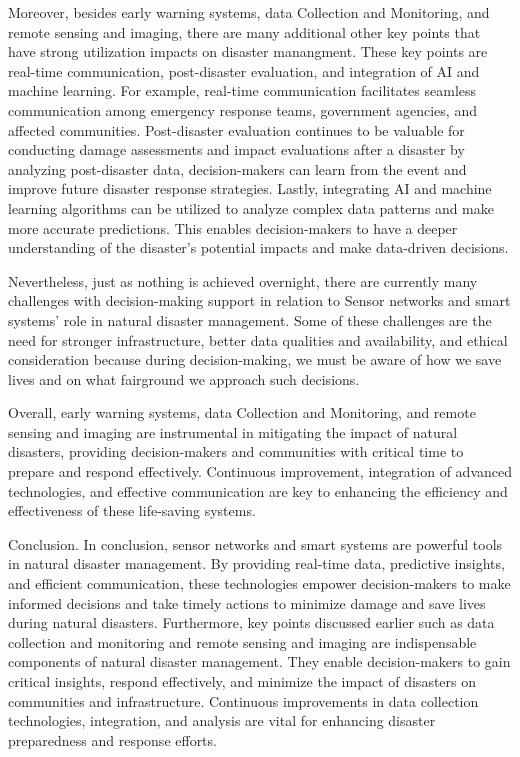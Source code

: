 \documentclass[conference]{IEEEtran}
\begin{document}
Moreover, besides early warning systems, data Collection and Monitoring, and remote sensing and imaging, 
there are many additional other key points that have strong utilization impacts on disaster manangment. 
These key points are real-time communication, post-disaster evaluation, and integration of AI and machine 
learning. For example, real-time communication facilitates seamless communication among emergency response 
teams, government agencies, and affected communities. Post-disaster evaluation continues to be valuable 
for conducting damage assessments and impact evaluations after a disaster by analyzing post-disaster 
data, decision-makers can learn from the event and improve future disaster response strategies. Lastly, 
integrating AI and machine learning algorithms can be utilized to analyze complex data patterns and make 
more accurate predictions. This enables decision-makers to have a deeper understanding of the disaster's 
potential impacts and make data-driven decisions.\par

Nevertheless, just as nothing is achieved overnight, there are currently many challenges with decision-making 
support in relation to Sensor networks and smart systems' role in natural disaster management. Some of these 
challenges are the need for stronger infrastructure, better data qualities and availability, and ethical 
consideration because during decision-making, we must be aware of how we save lives and on what fairground 
we approach such decisions.\par

Overall, early warning systems, data Collection and Monitoring, and remote sensing and imaging are instrumental 
in mitigating the impact of natural disasters, providing decision-makers and communities with critical 
time to prepare and respond effectively. Continuous improvement, integration of advanced technologies, 
and effective communication are key to enhancing the efficiency and effectiveness of these 
life-saving systems.\par

Conclusion. In conclusion, sensor networks and smart systems are powerful tools in natural disaster management. 
By providing real-time data, predictive insights, and efficient communication, these technologies empower 
decision-makers to make informed decisions and take timely actions to minimize damage and save lives 
during natural disasters. Furthermore, key points discussed earlier such as data collection and monitoring 
and remote sensing and imaging are indispensable components of natural disaster management. They enable 
decision-makers to gain critical insights, respond effectively, and minimize the impact of disasters 
on communities and infrastructure. Continuous improvements in data collection technologies, 
integration, and analysis are vital for enhancing disaster preparedness and response efforts.\par
\end{document}
